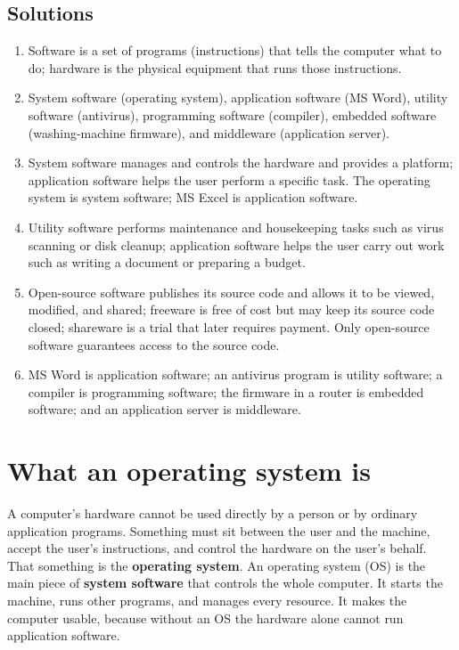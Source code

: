 \subsection*{Solutions}
\begingroup\small
\begin{enumerate}[label=\arabic*.]
  \item Software is a set of programs (instructions) that tells the computer
    what to do; hardware is the physical equipment that runs those
    instructions.
  \item System software (operating system), application software (MS Word),
    utility software (antivirus), programming software (compiler), embedded
    software (washing-machine firmware), and middleware (application server).
  \item System software manages and controls the hardware and provides a
    platform; application software helps the user perform a specific task.
    The operating system is system software; MS Excel is application
    software.
  \item Utility software performs maintenance and housekeeping tasks such as
    virus scanning or disk cleanup; application software helps the user carry
    out work such as writing a document or preparing a budget.
  \item Open-source software publishes its source code and allows it to be
    viewed, modified, and shared; freeware is free of cost but may keep its
    source code closed; shareware is a trial that later requires payment.
    Only open-source software guarantees access to the source code.
  \item MS Word is application software; an antivirus program is utility
    software; a compiler is programming software; the firmware in a router is
    embedded software; and an application server is middleware.
\end{enumerate}
\endgroup

\section{What an operating system is}
A computer's hardware cannot be used directly by a person or by ordinary
application programs. Something must sit between the user and the machine,
accept the user's instructions, and control the hardware on the user's behalf.
That something is the \textbf{operating system}. An operating system (OS) is
the main piece of \textbf{system software} that controls the whole computer. It
starts the machine, runs other programs, and manages every resource. It makes
the computer usable, because without an OS the hardware alone cannot run
application software.

